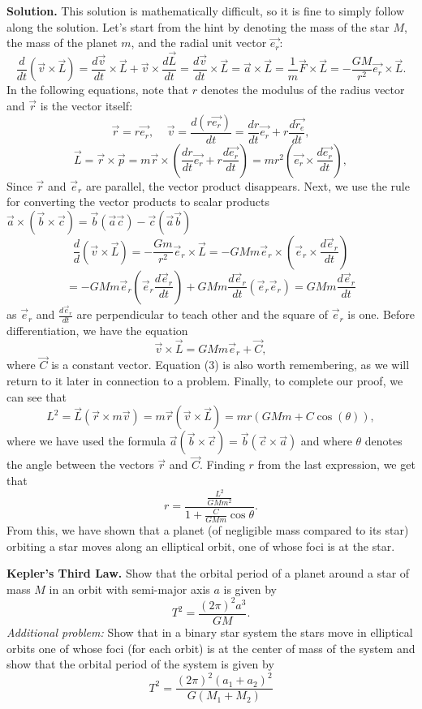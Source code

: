 \documentclass[11pt]{article}
\begin{document}
\textbf{Solution.} This solution is mathematically difficult, so it is fine to simply follow along the solution. Let's start from the hint by denoting the mass of the star $M$, the mass of the planet $m$, and the radial unit vector $\vec{e_r}$:
$$\dfrac{d}{dt}(\vec{v}\times\vec{L})=\dfrac{d\vec{v}}{dt}\times\vec{L}+\vec{v}\times\dfrac{d\vec{L}}{dt}=\dfrac{d\vec{v}}{dt}\times\vec{L}=\vec{a}\times\vec{L}=\dfrac{1}{m}\vec{F}\times\vec{L}=-\dfrac{GM}{r^2}\vec{e_r}\times\vec{L}.$$
In the following equations, note that $r$ denotes the modulus of the radius vector and $\vec{r}$ is the vector itself:
$$\vec{r}=r\vec{e_r},\;\;\;\;\vec{v}=\dfrac{d(r\vec{e_r})}{dt}=\dfrac{dr}{dt}\vec{e_r}+r\dfrac{d\vec{r_e}}{dt},$$
$$\vec{L}=\vec{r}\times\vec{p}=m\vec{r}\times\left(\dfrac{dr}{dt}\vec{e_r}+r\dfrac{d\vec{e_r}}{dt}\right)=mr^2\left(\vec{e_r}\times\dfrac{d\vec{e_r}}{dt}\right),$$
Since $\vec{r}$ and $\vec{e}_r$ are parallel, the vector product disappears. Next, we use the rule for converting the vector products to scalar products $\vec{a} \times (\vec{b} \times \vec{c}) = \vec{b}(\vec{a}\vec{c})-\vec{c}(\vec{a}\vec{b})$
$$\frac{d}{d}(\vec{v}\times\vec{L})=-\frac{Gm}{r^2}\vec{e}_r \times \vec{L} = -GMm\vec{e}_r \times \left(\vec{e}_r\times \frac{d \vec{e}_r}{dt}\right)$$
$$= -GMm\vec{e}_r \left(\vec{e}_r \frac{d \vec{e}_r}{dt}\right)+GMm\frac{d \vec{e}_r}{dt}(\vec{e}_r \vec{e}_r) = GMm\frac{d \vec{e}_r}{dt}$$
as $\vec{e}_r$ and $\displaystyle\frac{d\vec{e}_r}{dt}$ are perpendicular to teach other and the square of $\vec{e}_r$ is one. Before differentiation, we have the equation
\begin{equation}\label{eq:3}
    \vec{v}\times\vec{L}=GMm\vec{e}_r+\vec{C},
\end{equation}
where $\vec{C}$ is a constant vector. Equation (3) is also worth remembering, as we will return to it later in connection to a problem. Finally, to complete our proof, we can see that
$$L^2=\vec{L}\left(\vec{r}\times m\vec{v}\right)=m\vec{r}\left(\vec{v}\times\vec{L}\right)=mr\left(GMm+C\cos(\theta)\right),$$
where we have used the formula $\vec{a}(\vec{b}\times\vec{c})=\vec{b}(\vec{c}\times\vec{a})$ and where $\theta$ denotes the angle between the vectors $\vec{r}$ and $\vec{C}$. Finding $r$ from the last expression, we get that
$$r=\dfrac{\frac{L^2}{GMm^2}}{1+\frac{C}{GMm}\cos\theta}.$$
From this, we have shown that a planet (of negligible mass compared to its star) orbiting a star moves along an elliptical orbit, one of whose foci is at the star.

\textbf{Kepler's Third Law.} Show that the orbital period of a planet around a star of mass $M$ in an orbit with semi-major axis $a$ is given by
\begin{equation}
    T^2=\dfrac{(2\pi)^2a^3}{GM}.
\end{equation}
\textit{Additional problem:} Show that in a binary star system the stars move in elliptical orbits one of whose foci (for each orbit) is at the center of mass of the system and show that the orbital period of the system is given by
$$T^2=\dfrac{(2\pi)^2\left(a_1+a_2\right)^2}{G\left(M_1+M_2\right)}$$
\end{document}
